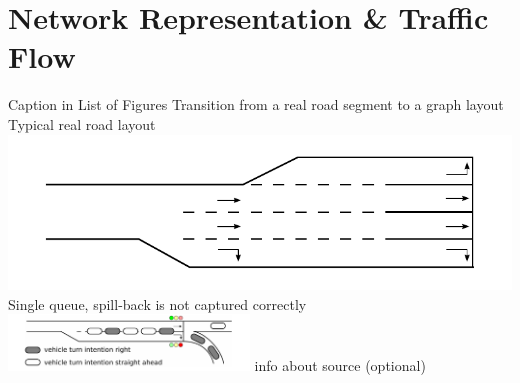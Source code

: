 %


\section{Network Representation \& Traffic Flow}
\label{sec:signals_network_traffic_flow}

\createfigure%
{Caption in List of Figures}%
{Transition from a real road segment to a graph layout}
{\label{fig:combined_model}}
{%
  \createsubfigure%
	{Typical real road layout}
	{\includegraphics[width=0.475\linewidth]{extending/figures/signalslanes/real_road_layout.pdf}}
	{\label{fig:real_road_layout}}
  \createsubfigure%
	{Single queue, spill-back is not captured correctly}%
	{\includegraphics[width=0.48\textwidth]{extending/figures/signalslanes/single_queue_model_inkscape.pdf}}%
	{\label{fig:lanes_representation_single_queue}}%
}%
{info about source (optional)}

